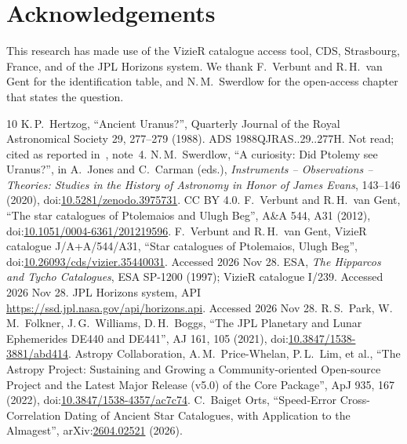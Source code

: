 \documentclass[11pt]{article}
\begin{document}
\section*{Acknowledgements}
This research has made use of the VizieR catalogue access tool, CDS, Strasbourg, France, and of the JPL Horizons system. We thank F.~Verbunt and R.\,H.~van Gent for the identification table, and N.\,M.~Swerdlow for the open-access chapter that states the question.

\begin{thebibliography}{10}
 K.\,P.~Hertzog, ``Ancient Uranus?'', Quarterly Journal of the Royal Astronomical Society 29, 277--279 (1988). ADS 1988QJRAS..29..277H. Not read; cited as reported in~\cite{swerdlow2020}, note~4.
 N.\,M.~Swerdlow, ``A curiosity: Did Ptolemy see Uranus?'', in A.~Jones and C.~Carman (eds.), \emph{Instruments -- Observations -- Theories: Studies in the History of Astronomy in Honor of James Evans}, 143--146 (2020), doi:\href{https://doi.org/10.5281/zenodo.3975731}{10.5281/zenodo.3975731}. CC BY 4.0.
 F.~Verbunt and R.\,H.~van Gent, ``The star catalogues of Ptolemaios and Ulugh Beg'', A\&A 544, A31 (2012), doi:\href{https://doi.org/10.1051/0004-6361/201219596}{10.1051/0004-6361/201219596}.
 F.~Verbunt and R.\,H.~van Gent, VizieR catalogue J/A+A/544/A31, ``Star catalogues of Ptolemaios, Ulugh Beg'', doi:\href{https://doi.org/10.26093/cds/vizier.35440031}{10.26093/cds/vizier.35440031}. Accessed 2026 Nov 28.
 ESA, \emph{The Hipparcos and Tycho Catalogues}, ESA SP-1200 (1997); VizieR catalogue I/239. Accessed 2026 Nov 28.
 JPL Horizons system, API \url{https://ssd.jpl.nasa.gov/api/horizons.api}. Accessed 2026 Nov 28.
 R.\,S.~Park, W.\,M.~Folkner, J.\,G.~Williams, D.\,H.~Boggs, ``The JPL Planetary and Lunar Ephemerides DE440 and DE441'', AJ 161, 105 (2021), doi:\href{https://doi.org/10.3847/1538-3881/abd414}{10.3847/1538-3881/abd414}.
 Astropy Collaboration, A.\,M.~Price-Whelan, P.\,L.~Lim, et al., ``The Astropy Project: Sustaining and Growing a Community-oriented Open-source Project and the Latest Major Release (v5.0) of the Core Package'', ApJ 935, 167 (2022), doi:\href{https://doi.org/10.3847/1538-4357/ac7c74}{10.3847/1538-4357/ac7c74}.
 C.~Baiget Orts, ``Speed-Error Cross-Correlation Dating of Ancient Star Catalogues, with Application to the Almagest'', arXiv:\href{https://arxiv.org/abs/2604.02521}{2604.02521} (2026).
\end{thebibliography}
\end{document}
